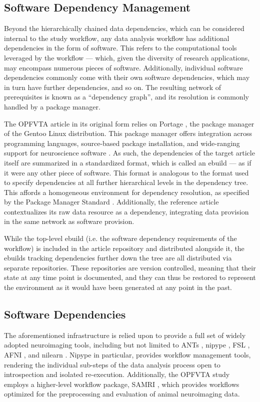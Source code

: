 \subsection{Software Dependency Management}

Beyond the hierarchically chained data dependencies, which can be considered internal to the study workflow, any data analysis workflow has additional dependencies in the form of software.
This refers to the computational tools leveraged by the workflow — which, given the diversity of research applications, may encompass numerous pieces of software.
Additionally, individual software dependencies commonly come with their own software dependencies, which may in turn have further dependencies, and so on.
The resulting network of prerequisites is known as a “dependency graph”, and its resolution is commonly handled by a package manager.

The OPFVTA article in its original form relies on Portage \cite{portage}, the package manager of the Gentoo Linux distribution.
This package manager offers integration across programming languages, source-based package installation, and wide-ranging support for neuroscience software \cite{ng}.
As such, the dependencies of the target article itself are summarized in a standardized format, which is called an ebuild — as if it were any other piece of software.
This format is analogous to the format used to specify dependencies at all further hierarchical levels in the dependency tree.
This affords a homogeneous environment for dependency resolution, as specified by the Package Manager Standard \cite{pms}.
Additionally, the reference article contextualizes its raw data resource as a dependency, integrating data provision in the same network as software provision.

While the top-level ebuild (i.e. the software dependency requirements of the workflow) is included in the article repository and distributed alongside it, the ebuilds tracking dependencies further down the tree are all distributed via separate repositories.
These repositories are version controlled, meaning that their state at any time point is documented, and they can thus be restored to represent the environment as it would have been generated at any point in the past.


\subsection{Software Dependencies}

The aforementioned infrastructure is relied upon to provide a full set of widely adopted neuroimaging tools, including but not limited to ANTs \cite{ants}, nipype \cite{nipype}, FSL \cite{fsl}, AFNI \cite{afni}, and nilearn \cite{nilearn}.
Nipype in particular, provides workflow management tools, rendering the individual sub-steps of the data analysis process open to introspection and isolated re-execution.
Additionally, the OPFVTA study employs a higher-level workflow package, SAMRI \cite{samri,irsabi}, which provides workflows optimized for the preprocessing and evaluation of animal neuroimaging data.



